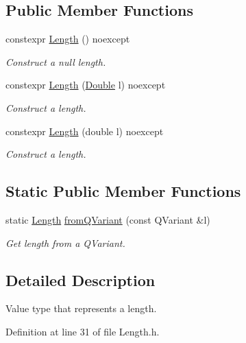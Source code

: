 \subsection*{Public Member Functions}
\begin{DoxyCompactItemize}
\item 
constexpr \hyperlink{class_mdt_1_1_numeric_1_1_length_a7ad7b263b98b280ba6d383edc260d2a5}{Length} () noexcept
\begin{DoxyCompactList}\small\item\em Construct a null length. \end{DoxyCompactList}\item 
constexpr \hyperlink{class_mdt_1_1_numeric_1_1_length_a7d7b7aa5f63272a62870dbe782af0adb}{Length} (\hyperlink{class_mdt_1_1_numeric_1_1_double}{Double} l) noexcept
\begin{DoxyCompactList}\small\item\em Construct a length. \end{DoxyCompactList}\item 
constexpr \hyperlink{class_mdt_1_1_numeric_1_1_length_abc975577596b9b57d134ef814ff6a0e4}{Length} (double l) noexcept
\begin{DoxyCompactList}\small\item\em Construct a length. \end{DoxyCompactList}\end{DoxyCompactItemize}
\subsection*{Static Public Member Functions}
\begin{DoxyCompactItemize}
\item 
static \hyperlink{class_mdt_1_1_numeric_1_1_length}{Length} \hyperlink{class_mdt_1_1_numeric_1_1_length_ad4e60674e598aa2dcaec5080b0657e24}{from\+Q\+Variant} (const Q\+Variant \&l)
\begin{DoxyCompactList}\small\item\em Get length from a Q\+Variant. \end{DoxyCompactList}\end{DoxyCompactItemize}


\subsection{Detailed Description}
Value type that represents a length. 

Definition at line 31 of file Length.\+h.



